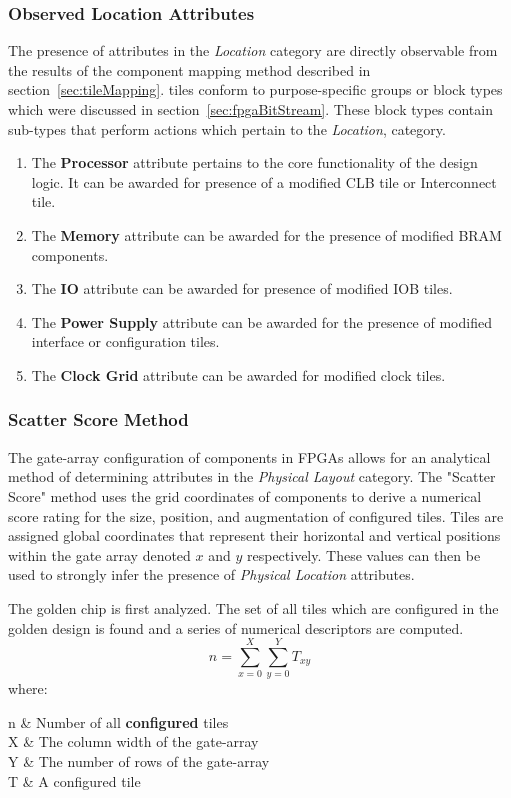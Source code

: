 \subsubsection{Observed Location Attributes}
The presence of attributes in the \textit{Location} category are directly observable from the results of the component mapping method described in section~\ref{sec:tileMapping}.
\Xilinx tiles conform to purpose-specific groups or block types which were discussed in section~\ref{sec:fpgaBitStream}.
These block types contain sub-types that perform actions which pertain to the \textit{Location}, category. 
\begin{enumerate}
	\item The \textbf{Processor} attribute pertains to the core functionality of the design logic. It can be awarded for presence of a modified \acrshort{CLB} tile or Interconnect tile.
	\item The \textbf{Memory} attribute can be awarded for the presence of modified \acrshort{BRAM} components.
	\item The \textbf{\acrshort{IO}} attribute can be awarded for presence of modified \acrshort{IOB} tiles.
	\item The \textbf{Power Supply} attribute can be awarded for the presence of modified interface or configuration tiles.
	\item The \textbf{Clock Grid} attribute can be awarded for modified clock tiles.
\end{enumerate}
\subsubsection{Scatter Score Method} \label{sec:scatterScore}
The gate-array configuration of components in \Xilinx \acrshort{FPGA}s allows for an analytical method of determining attributes in the \textit{Physical Layout} category.
The "Scatter Score" method uses the grid coordinates of components to derive a numerical score rating for the size, position, and augmentation of configured tiles.
Tiles are assigned global coordinates that represent their horizontal and vertical positions within the gate array denoted $x$ and $y$ respectively. 
These values can then be used to strongly infer the presence of \textit{Physical Location} attributes.

The golden chip is first analyzed.
The set of all tiles which are configured in the golden design is found and a series of numerical descriptors are computed.
\begin{equation} \label{eqn:numConfiguredTiles}
n = \sum_{x = 0}^{X}\sum_{y = 0}^{Y}T_{xy}
\end{equation}
\ConditionSize
where:
\begin{conditions}
	n     &  Number of all \textbf{configured} tiles \\
	X     &  The column width of the gate-array \\   
	Y     &  The number of rows of the gate-array \\
	T     &  A configured tile
\end{conditions}
\normalsize


